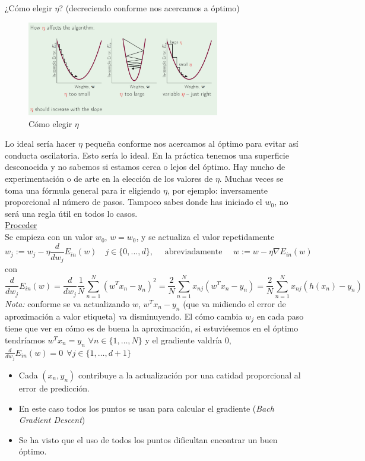 \documentclass[11pt,a4paper]{article}
\theoremstyle{definition}
\begin{document}
	¿Cómo elegir $\eta$? (decreciendo conforme nos acercamos a óptimo)
		\begin{figure}[h!]
	\centering
	\includegraphics[width=0.75\textwidth]{images/tasa_apren}
	\caption{Cómo elegir $\eta$}
	\end{figure}
	
	Lo ideal sería hacer $\eta$ pequeña conforme nos acercamos al óptimo para evitar así conducta oscilatoria. Esto sería lo ideal. En la práctica tenemos una superficie desconocida y no sabemos si estamos cerca o lejos del óptimo. Hay mucho de experimentación o de arte en la elección de los valores de $\eta$. Muchas veces se toma una fórmula general para ir eligiendo $\eta$, por ejemplo: inversamente proporcional al número de pasos. Tampoco sabes donde has iniciado el $w_0$, no será una regla útil en todos lo casos.\\
	
	\underline{Proceder}\\
	Se empieza con un valor $w_0$, $w=w_0$, y se actualiza el valor repetidamente
	$$w_j:=w_j-\eta \frac{d}{dw_j}E_{in}(w) \quad j \in \{0,...,d\}, \quad \text{ abreviadamente } \quad w:=w-\eta \nabla E_{in}(w)$$
	con
	$$\frac{d}{dw_j}E_{in}(w)=\frac{d}{dw_j}\frac{1}{N}\sum_{n=1}^N (w^Tx_n-y_n)^2=\frac{2}{N}\sum_{n=1}^N x_{nj}(w^Tx_n-y_n)=\frac{2}{N}\sum_{n=1}^N x_{nj}(h(x_n)-y_n)$$
	\textit{Nota:} conforme se va actualizando $w$, $w^Tx_n-y_n$ (que va midiendo el error de aproximación a valor etiqueta) va disminuyendo. El cómo cambia $w_j$ en cada paso tiene que ver en cómo es de buena la aproximación, si estuviésemos en el óptimo tendríamos $w^Tx_n=y_n$ $\forall n \in \{1,\ldots,N\}$ y el gradiente valdría 0, $\frac{d}{dw_j}E_{in}(w) = 0 \ \ \forall j \in \{1,\ldots,d+1\}$
	
	\begin{itemize}
		\item Cada $(x_n,y_n)$ contribuye a la actualización por una catidad proporcional al error de predicción.
		\item En este caso todos los puntos se usan para calcular el gradiente (\textit{Bach Gradient Descent})
		\item Se ha visto que el uso de todos los puntos dificultan encontrar un buen óptimo.
	\end{itemize}
	
\end{document}
